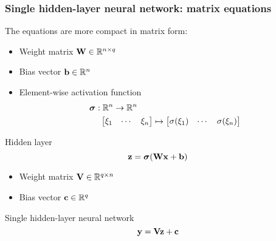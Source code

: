 \begin{frame}
    \frametitle{Single hidden-layer neural network: matrix equations}

    The equations are more compact in matrix form:
    \begin{itemize}
        \item Weight matrix $\mathbf{W} \in \mathbb{R}^{n \times q}$
        \item Bias vector $\mathbf{b} \in \mathbb{R}^n$
        \item Element-wise activation function
        \begin{align*}
            \bm{\sigma} &: \mathbb{R}^n \to \mathbb{R}^n \\
            &\hspace{1.25ex} \begin{bmatrix} \xi_1 & \cdots & \xi_n \end{bmatrix} \mapsto
            \begin{bmatrix} \sigma(\xi_1) & \cdots & \sigma(\xi_n) \end{bmatrix}
        \end{align*}
    \end{itemize}

    \begin{block}{Hidden layer}
        \begin{equation*}
            \mathbf{z} = \bm{\sigma}(\mathbf{W} \mathbf{x} + \mathbf{b})
        \end{equation*}
    \end{block}
    \pause

    \begin{itemize}
        \item Weight matrix $\mathbf{V} \in \mathbb{R}^{q \times n}$
        \item Bias vector $\mathbf{c} \in \mathbb{R}^q$
    \end{itemize}

    \begin{block}{Single hidden-layer neural network}
        \begin{equation*}
            \mathbf{y} = \mathbf{V} \mathbf{z} + \mathbf{c}
        \end{equation*}
    \end{block}
\end{frame}

